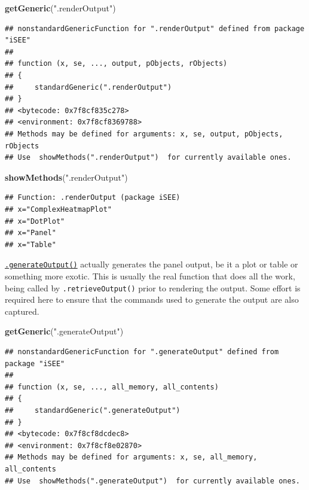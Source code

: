 \documentclass[
]{book}
\newenvironment{Shaded}{\begin{snugshade}}{\end{snugshade}}
\newcommand{\KeywordTok}[1]{\textcolor[rgb]{0.13,0.29,0.53}{\textbf{#1}}}
\newcommand{\NormalTok}[1]{#1}
\newcommand{\StringTok}[1]{\textcolor[rgb]{0.31,0.60,0.02}{#1}}
\begin{document}
\begin{Shaded}
\begin{Highlighting}[]
\KeywordTok{getGeneric}\NormalTok{(}\StringTok{".renderOutput"}\NormalTok{)}
\end{Highlighting}
\end{Shaded}

\begin{verbatim}
## nonstandardGenericFunction for ".renderOutput" defined from package "iSEE"
## 
## function (x, se, ..., output, pObjects, rObjects) 
## {
##     standardGeneric(".renderOutput")
## }
## <bytecode: 0x7f8cf835c278>
## <environment: 0x7f8cf8369788>
## Methods may be defined for arguments: x, se, output, pObjects, rObjects
## Use  showMethods(".renderOutput")  for currently available ones.
\end{verbatim}

\begin{Shaded}
\begin{Highlighting}[]
\KeywordTok{showMethods}\NormalTok{(}\StringTok{".renderOutput"}\NormalTok{)}
\end{Highlighting}
\end{Shaded}

\begin{verbatim}
## Function: .renderOutput (package iSEE)
## x="ComplexHeatmapPlot"
## x="DotPlot"
## x="Panel"
## x="Table"
\end{verbatim}

\href{https://isee.github.io/iSEE/reference/output-generics.html}{\texttt{.generateOutput()}} actually generates the panel output, be it a plot or table or something more exotic.
This is usually the real function that does all the work, being called by \texttt{.retrieveOutput()} prior to rendering the output.
Some effort is required here to ensure that the commands used to generate the output are also captured.

\begin{Shaded}
\begin{Highlighting}[]
\KeywordTok{getGeneric}\NormalTok{(}\StringTok{".generateOutput"}\NormalTok{)}
\end{Highlighting}
\end{Shaded}

\begin{verbatim}
## nonstandardGenericFunction for ".generateOutput" defined from package "iSEE"
## 
## function (x, se, ..., all_memory, all_contents) 
## {
##     standardGeneric(".generateOutput")
## }
## <bytecode: 0x7f8cf8dcdec8>
## <environment: 0x7f8cf8e02870>
## Methods may be defined for arguments: x, se, all_memory, all_contents
## Use  showMethods(".generateOutput")  for currently available ones.
\end{verbatim}
\end{document}
